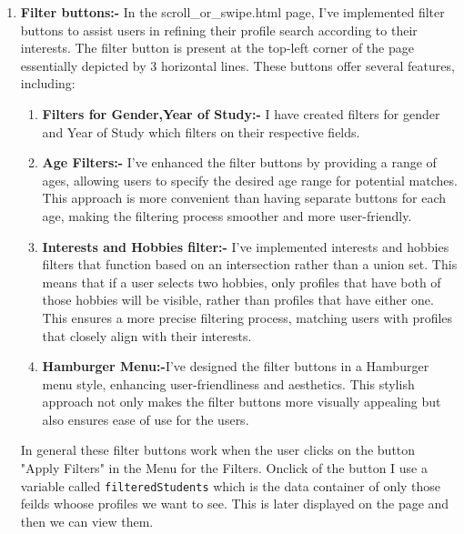 \documentclass{article}
\begin{document}
\begin{enumerate}
\item \textbf{Filter buttons:-} In the scroll\_or\_swipe.html page, I've implemented filter buttons to assist users in refining their profile search according to their interests. The filter button is present at the top-left corner of the page essentially depicted by 3 horizontal lines. These buttons offer several features, including:
\begin{enumerate}
    \item \textbf{Filters for Gender,Year of Study:-} I have created filters for gender and Year of Study which filters on their respective fields. 
    \item \textbf{Age Filters:-} I've enhanced the filter buttons by providing a range of ages, allowing users to specify the desired age range for potential matches. This approach is more convenient than having separate buttons for each age, making the filtering process smoother and more user-friendly.
    \item \textbf{Interests and Hobbies filter:-} I've implemented interests and hobbies filters that function based on an intersection rather than a union set. This means that if a user selects two hobbies, only profiles that have both of those hobbies will be visible, rather than profiles that have either one. This ensures a more precise filtering process, matching users with profiles that closely align with their interests.
    \item \textbf{Hamburger Menu:-}I've designed the filter buttons in a Hamburger menu style, enhancing user-friendliness and aesthetics. This stylish approach not only makes the filter buttons more visually appealing but also ensures ease of use for the users.
\end{enumerate}
In general these filter buttons work when the user clicks on the button "Apply Filters" in the Menu for the Filters. Onclick of the button I use a variable called \texttt{filteredStudents} which is the data container of only those feilds whoose profiles we want to see. This is later displayed on the page and then we can view them.


\end{enumerate}
\end{document}
